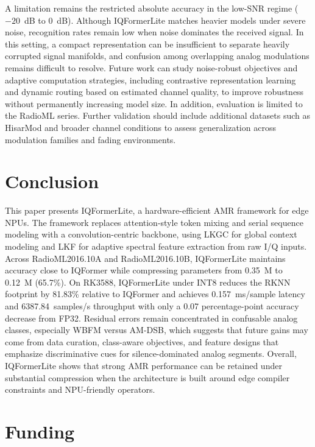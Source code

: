 \documentclass{article}
\begin{document}
	A limitation remains the restricted absolute accuracy in the low-SNR regime ($-20$~dB to $0$~dB).
	Although IQFormerLite matches heavier models under severe noise, recognition rates remain low when noise dominates the received signal.
	In this setting, a compact representation can be insufficient to separate heavily corrupted signal manifolds, and confusion among overlapping analog modulations remains difficult to resolve.
	Future work can study noise-robust objectives and adaptive computation strategies, including contrastive representation learning and dynamic routing based on estimated channel quality, to improve robustness without permanently increasing model size.
	In addition, evaluation is limited to the RadioML series.
	Further validation should include additional datasets such as HisarMod \cite{tekbiyik2019HisarModnew} and broader channel conditions to assess generalization across modulation families and fading environments.
	
	\section{Conclusion}
	\label{sec:conclusion}
	
	This paper presents IQFormerLite, a hardware-efficient AMR framework for edge NPUs.
	The framework replaces attention-style token mixing and serial sequence modeling with a convolution-centric backbone, using LKGC for global context modeling and LKF for adaptive spectral feature extraction from raw I/Q inputs.
	Across RadioML2016.10A and RadioML2016.10B, IQFormerLite maintains accuracy close to IQFormer while compressing parameters from 0.35~M to 0.12~M (65.7\%).
	On RK3588, IQFormerLite under INT8 reduces the RKNN footprint by 81.83\% relative to IQFormer and achieves 0.157~ms/sample latency and 6387.84~samples/s throughput with only a 0.07 percentage-point accuracy decrease from FP32.
	Residual errors remain concentrated in confusable analog classes, especially WBFM versus AM-DSB, which suggests that future gains may come from data curation, class-aware objectives, and feature designs that emphasize discriminative cues for silence-dominated analog segments.
	Overall, IQFormerLite shows that strong AMR performance can be retained under substantial compression when the architecture is built around edge compiler constraints and NPU-friendly operators.
	
	\section*{Funding}
	
\end{document}
